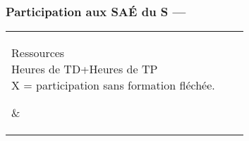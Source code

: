 \subsubsection{Participation aux SAÉ du S — }
\begin{minipage}{\textwidth}
  \begin{center}
    \bigskip
    \resetwidth
    \begin{tabular}{l%
        cc%
      }
      \toprule
      \parbox[b]{5cm}{
        \begin{flushleft}
          Ressources\\
          Heures de TD+Heures de TP\\
          X = participation sans formation fléchée.
        \end{flushleft}
      }
      &
      \\
      \cmidrule(lr){-}
      

\end{tabular}
\end{center}
\end{minipage}
